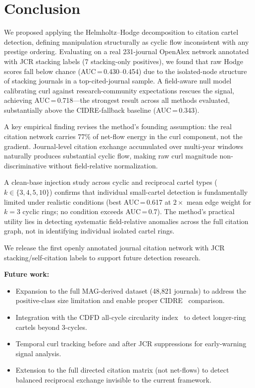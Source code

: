 \documentclass[twocolumn,11pt,letterpaper]{article}
\begin{document}
\section{Conclusion}

We proposed applying the Helmholtz--Hodge decomposition to citation cartel
detection, defining manipulation structurally as cyclic flow inconsistent with
any prestige ordering. Evaluating on a real 231-journal OpenAlex network
annotated with JCR stacking labels (7 stacking-only positives), we found that
raw Hodge scores fall below chance (AUC\,=\,0.430--0.454) due to the
isolated-node structure of stacking journals in a top-cited-journal sample. A
field-aware null model calibrating curl against research-community expectations
rescues the signal, achieving AUC\,=\,0.718---the strongest result across all
methods evaluated, substantially above the CIDRE-fallback baseline
(AUC\,=\,0.343).

A key empirical finding revises the method's founding assumption: the real
citation network carries 77\% of net-flow energy in the curl component, not the
gradient. Journal-level citation exchange accumulated over multi-year windows
naturally produces substantial cyclic flow, making raw curl magnitude
non-discriminative without field-relative normalization.

A clean-base injection study across cyclic and reciprocal cartel types
($k \in \{3,4,5,10\}$) confirms that individual small-cartel detection is
fundamentally limited under realistic conditions (best AUC\,=\,0.617 at
$2\times$ mean edge weight for $k = 3$ cyclic rings; no condition exceeds
AUC\,=\,0.7). The method's practical utility lies in detecting systematic
field-relative anomalies across the full citation graph, not in identifying
individual isolated cartel rings.

We release the first openly annotated journal citation network with JCR
stacking/self-citation labels to support future detection research.

\smallskip\noindent\textbf{Future work:}
\begin{itemize}
  \item Expansion to the full MAG-derived dataset (48,821 journals) to address
    the positive-class size limitation and enable proper CIDRE~\cite{Kojaku2020}
    comparison.
  \item Integration with the CDFD all-cycle circularity index~\cite{HomsDones2025}
    to detect longer-ring cartels beyond 3-cycles.
  \item Temporal curl tracking before and after JCR suppressions for
    early-warning signal analysis.
  \item Extension to the full directed citation matrix (not net-flows) to detect
    balanced reciprocal exchange invisible to the current framework.
\end{itemize}



\end{document}
